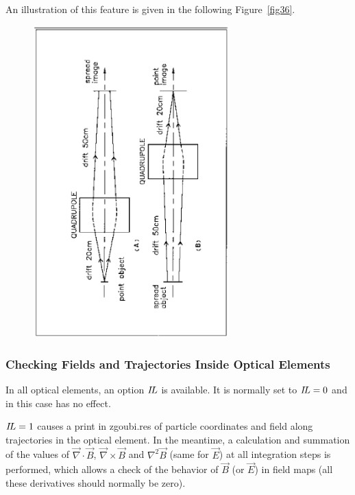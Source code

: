 \noindent An illustration of this feature is given in the following
Figure~\ref{fig36}.    


\begin{figure}[H]
\centerline{\includegraphics[height=12cm,angle=-90]{Fig36.ps}}
\end{figure}


\subsubsection{Checking Fields and Trajectories Inside Optical Elements}  \label{sec4.6.1}

In all optical elements, an option $ I\!L $ is available.  It
is normally set to $I\!L =0$ and in this case has no effect.

\noindent $ I\!L=1 $ causes a print  in zgoubi.res  of particle 
coordinates and field
along trajectories in the optical element.  In the meantime, a calculation and summation of
the values of $ \vec  \nabla \cdot\vec  B$, 
 $ \vec  \nabla \times\vec  B $ and $ \nabla^2\vec  B $ (same for $\vec E$) at all 
integration steps is performed, which allows a check of the behavior of 
$ \vec  B $ (or $ \vec  E $) in field maps (all these derivatives should normally be zero).

